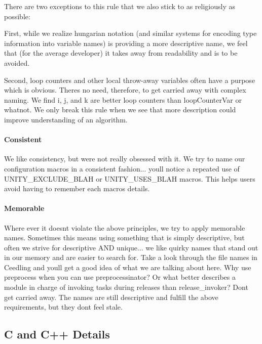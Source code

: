 There are two exceptions to this rule that we also stick to as religiously as possible\+:

First, while we realize hungarian notation (and similar systems for encoding type information into variable names) is providing a more descriptive name, we feel that (for the average developer) it takes away from readability and is to be avoided.

Second, loop counters and other local throw-\/away variables often have a purpose which is obvious. There\textquotesingle{}s no need, therefore, to get carried away with complex naming. We find i, j, and k are better loop counters than loop\+Counter\+Var or whatnot. We only break this rule when we see that more description could improve understanding of an algorithm.

\paragraph*{Consistent}

We like consistency, but we\textquotesingle{}re not really obsessed with it. We try to name our configuration macros in a consistent fashion... you\textquotesingle{}ll notice a repeated use of U\+N\+I\+T\+Y\+\_\+\+E\+X\+C\+L\+U\+D\+E\+\_\+\+B\+L\+AH or U\+N\+I\+T\+Y\+\_\+\+U\+S\+E\+S\+\_\+\+B\+L\+AH macros. This helps users avoid having to remember each macro\textquotesingle{}s details.

\paragraph*{Memorable}

Where ever it doesn\textquotesingle{}t violate the above principles, we try to apply memorable names. Sometimes this means using something that is simply descriptive, but often we strive for descriptive A\+ND unique... we like quirky names that stand out in our memory and are easier to search for. Take a look through the file names in Ceedling and you\textquotesingle{}ll get a good idea of what we are talking about here. Why use preprocess when you can use preprocessinator? Or what better describes a module in charge of invoking tasks during releases than release\+\_\+invoker? Don\textquotesingle{}t get carried away. The names are still descriptive and fulfill the above requirements, but they don\textquotesingle{}t feel stale.

\subsection*{C and C++ Details}

